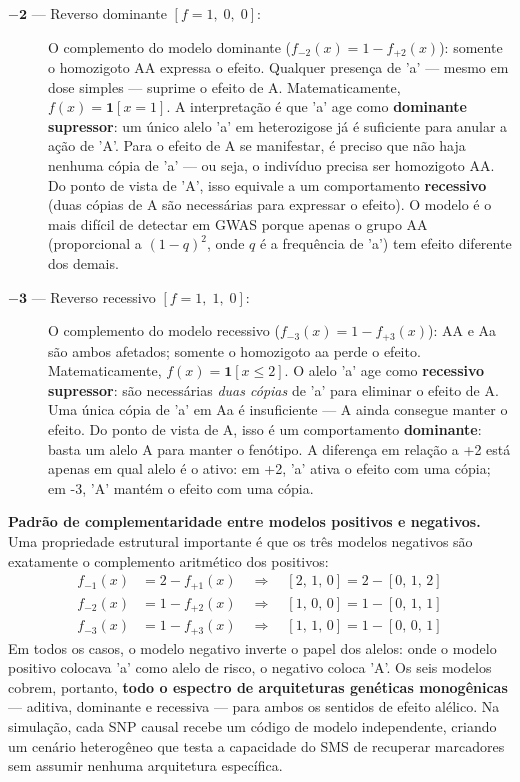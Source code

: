 \documentclass[
    12pt,
    a4paper,
    oneside,
    english,
    french,
    spanish,
    brazil
    ]{abntex2}
\newcommand{\novo}[1]{\textcolor{corNova}{#1}}
\begin{document}
\begin{description}
  \item[\novo{$\boldsymbol{-2}$ --- Reverso dominante $[f = 1,\;0,\;0]$:}]
  \novo{O complemento do modelo dominante ($f_{-2}(x) = 1 - f_{+2}(x)$): somente o homozigoto AA expressa o efeito. Qualquer presença de 'a' --- mesmo em dose simples --- suprime o efeito de A. Matematicamente, $f(x) = \mathbf{1}[x = 1]$. A interpretação é que 'a' age como \textbf{dominante supressor}: um único alelo 'a' em heterozigose já é suficiente para anular a ação de 'A'. Para o efeito de A se manifestar, é preciso que não haja nenhuma cópia de 'a' --- ou seja, o indivíduo precisa ser homozigoto AA. Do ponto de vista de 'A', isso equivale a um comportamento \textbf{recessivo} (duas cópias de A são necessárias para expressar o efeito). O modelo é o mais difícil de detectar em GWAS porque apenas o grupo AA (proporcional a $(1-q)^2$, onde $q$ é a frequência de 'a') tem efeito diferente dos demais.}

  \item[\novo{$\boldsymbol{-3}$ --- Reverso recessivo $[f = 1,\;1,\;0]$:}]
  \novo{O complemento do modelo recessivo ($f_{-3}(x) = 1 - f_{+3}(x)$): AA e Aa são ambos afetados; somente o homozigoto aa perde o efeito. Matematicamente, $f(x) = \mathbf{1}[x \leq 2]$. O alelo 'a' age como \textbf{recessivo supressor}: são necessárias \textit{duas cópias} de 'a' para eliminar o efeito de A. Uma única cópia de 'a' em Aa é insuficiente --- A ainda consegue manter o efeito. Do ponto de vista de A, isso é um comportamento \textbf{dominante}: basta um alelo A para manter o fenótipo. A diferença em relação a +2 está apenas em qual alelo é o ativo: em +2, 'a' ativa o efeito com uma cópia; em -3, 'A' mantém o efeito com uma cópia.}

\end{description}

\novo{\textbf{Padrão de complementaridade entre modelos positivos e negativos.} Uma propriedade estrutural importante é que os três modelos negativos são exatamente o complemento aritmético dos positivos:}
\begin{align*}
  f_{-1}(x) &= 2 - f_{+1}(x) \quad \Rightarrow \quad [2,\,1,\,0] = 2 - [0,\,1,\,2] \\
  f_{-2}(x) &= 1 - f_{+2}(x) \quad \Rightarrow \quad [1,\,0,\,0] = 1 - [0,\,1,\,1] \\
  f_{-3}(x) &= 1 - f_{+3}(x) \quad \Rightarrow \quad [1,\,1,\,0] = 1 - [0,\,0,\,1]
\end{align*}
\novo{Em todos os casos, o modelo negativo inverte o papel dos alelos: onde o modelo positivo colocava 'a' como alelo de risco, o negativo coloca 'A'. Os seis modelos cobrem, portanto, \textbf{todo o espectro de arquiteturas genéticas monogênicas} --- aditiva, dominante e recessiva --- para ambos os sentidos de efeito alélico. Na simulação, cada SNP causal recebe um código de modelo independente, criando um cenário heterogêneo que testa a capacidade do SMS de recuperar marcadores sem assumir nenhuma arquitetura específica.}
\end{document}
